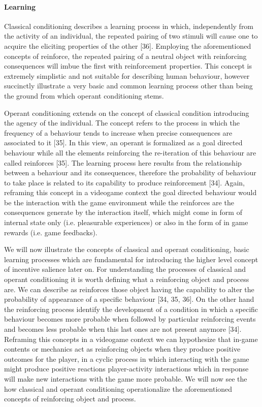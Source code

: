 \paragraph{Learning}
\label{learning}
Classical conditioning describes a learning process in which, independently from the activity of an individual, the repeated pairing of two stimuli will cause one to acquire the eliciting properties of the other [36]. Employing the aforementioned concepts of reinforce, the repeated pairing of a neutral object with reinforcing consequences will imbue the first with reinforcement properties. This concept is extremely simplistic and not suitable for describing human behaviour, however succinctly illustrate a very basic and common learning process other than being the ground from which operant conditioning stems.

Operant conditioning extends on the concept of classical condition introducing the agency of the individual. The concept refers to the process in which the frequency of a behaviour tends to increase when precise consequences are associated to it [35]. In this view, an operant is formalized as a goal directed behaviour while all the elements reinforcing the re-iteration of this behaviour are called reinforces [35]. The learning process here results from the relationship between a behaviour and its consequences, therefore the probability of behaviour to take place is related to its capability to produce reinforcement [34]. Again, reframing this concept in a videogame context the goal directed behaviour would be the interaction with the game environment while the reinforces are the consequences generate by the interaction itself, which might come in form of internal state only (i.e. pleasurable experiences) or also in the form of in game rewards (i.e. game feedbacks).

We will now illustrate the concepts of classical and operant conditioning, basic learning processes which are fundamental for introducing the higher level concept of incentive salience later on. For understanding the processes of classical and operant conditioning it is worth defining what a reinforcing object and process are. We can describe as reinforces those object having the capability to alter the probability of appearance of a specific behaviour [34, 35, 36].  On the other hand the reinforcing process identify the development of a condition in which a specific behaviour becomes more probable when followed by particular reinforcing events and becomes less probable when this last ones are not present anymore [34]. Reframing this concepts in a videogame context we can hypothesize that in-game contents or mechanics act as reinforcing objects when they produce positive outcomes for the player, in a cyclic process in which interacting with the game might produce positive reactions player-activity interactions which in response will make new interactions with the game more probable. 
We will now see the how classical and operant conditioning operationalize the aforementioned concepts of reinforcing object and process.

